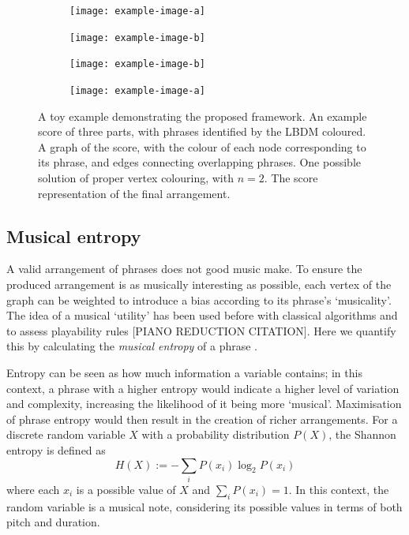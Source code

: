 \documentclass[12pt]{article}
\theoremstyle{definition}
\begin{document}
\begin{figure}
    \begin{subfigure}{0.5\textwidth}
        \texttt{[image: example-image-a]}
        \caption{}
        \label{fig:toy-phrases}
    \end{subfigure}\hfill
    \begin{subfigure}{0.5\textwidth}
        \texttt{[image: example-image-b]}
        \caption{}
        \label{fig:toy-graph}
    \end{subfigure}
    \begin{subfigure}{0.5\textwidth}
        \texttt{[image: example-image-b]}
        \caption{}
        \label{fig:toy-solution}
    \end{subfigure}\hfill
    \begin{subfigure}{0.5\textwidth}
        \texttt{[image: example-image-a]}
        \caption{}
        \label{fig:toy-arrangement}
    \end{subfigure}

    \caption[A toy example demonstrating the proposed framework.]{A toy example demonstrating the proposed framework.  An example score of three parts, with phrases identified by the LBDM coloured.  A graph of the score, with the colour of each node corresponding to its phrase, and edges connecting overlapping phrases.  One possible solution of proper vertex colouring, with $n=2$.  The score representation of the final arrangement.}
    \label{fig:toy}
\end{figure}

\subsection{Musical entropy}

A valid arrangement of phrases does not good music make. To ensure the produced arrangement is as musically interesting as possible, each vertex of the graph can be weighted to introduce a bias according to its phrase's `musicality'. The idea of a musical `utility' has been used before with classical algorithms \cite{huang_towards_2012} and to assess playability rules [PIANO REDUCTION CITATION]. Here we quantify this by calculating the \emph{musical entropy} of a phrase \cite{li_entropy_2019}.

Entropy can be seen as how much information a variable contains; in this context, a phrase with a higher entropy would indicate a higher level of variation and complexity, increasing the likelihood of it being more `musical'. Maximisation of phrase entropy would then result in the creation of richer arrangements. For a discrete random variable $X$ with a probability distribution $P(X)$, the Shannon entropy is defined as
\begin{equation}
    H(X):=-\sum_i P(x_i)\log_2 P(x_i)
    \label{eq:entropy}
\end{equation}
where each $x_i$ is a possible value of $X$ and ${\sum_i P(x_i)=1}$. In this context, the random variable is a musical note, considering its possible values in terms of both pitch and duration.
\end{document}
